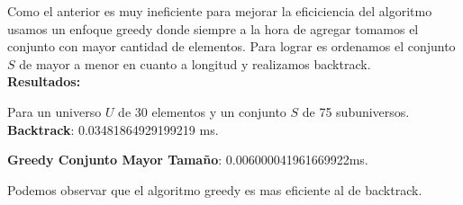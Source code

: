 \documentclass{article}
\begin{document}
Como el anterior es muy ineficiente para mejorar la eficiciencia del algoritmo usamos un enfoque greedy donde siempre a la hora de agregar tomamos el conjunto con mayor cantidad de elementos. Para lograr es ordenamos el conjunto \(S\) de mayor a menor en cuanto a longitud y realizamos backtrack.\\

\textbf{Resultados:}

Para un universo \(U\) de 30 elementos y un conjunto \(S\) de 75 subuniversos. \\

\textbf{Backtrack}: 0.03481864929199219 ms.

\textbf{Greedy Conjunto Mayor Tamaño}: 0.006000041961669922ms.

Podemos observar que el algoritmo greedy es mas eficiente al de backtrack.
\end{document}
